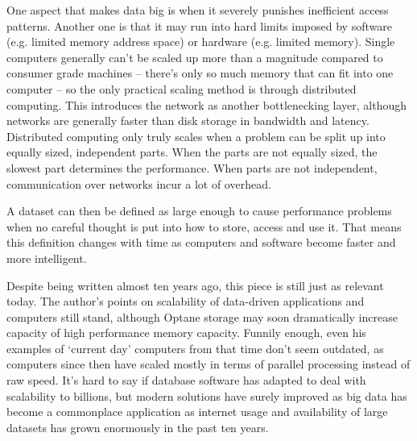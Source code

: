 \documentclass{article}
\begin{document}
One aspect that makes data big is when it severely punishes inefficient access 
patterns. Another one is that it may run into hard limits imposed by software 
(e.g. limited memory address space) or hardware (e.g. limited memory). Single 
computers generally can’t be scaled up more than a magnitude compared to 
consumer grade machines – there’s only so much memory that can fit into one 
computer – so the only practical scaling method is through distributed 
computing. This introduces the network as another bottlenecking layer, 
although networks are generally faster than disk storage in bandwidth and 
latency. Distributed computing only truly scales when a problem can be split 
up into equally sized, independent parts. When the parts are not equally 
sized, the slowest part determines the performance. When parts are not 
independent, communication over networks incur a lot of overhead.

A dataset can then be defined as large enough to cause performance problems 
when no careful thought is put into how to store, access and use it. That means
this definition changes with time as computers and software become faster and 
more intelligent.



Despite being written almost ten years ago, this piece is still just as relevant 
today. The author’s points on scalability of data-driven applications and 
computers still stand, although Optane storage may soon dramatically increase 
capacity of high performance memory capacity. Funnily enough, even his examples 
of ‘current day’ computers from that time don’t seem outdated, as computers 
since then have scaled mostly in terms of parallel processing instead of raw 
speed. It’s hard to say if database software has adapted to deal with 
scalability to billions, but modern solutions have surely improved as big data 
has become a commonplace application as internet usage and availability of large 
datasets has grown enormously in the past ten years.
\end{document}
